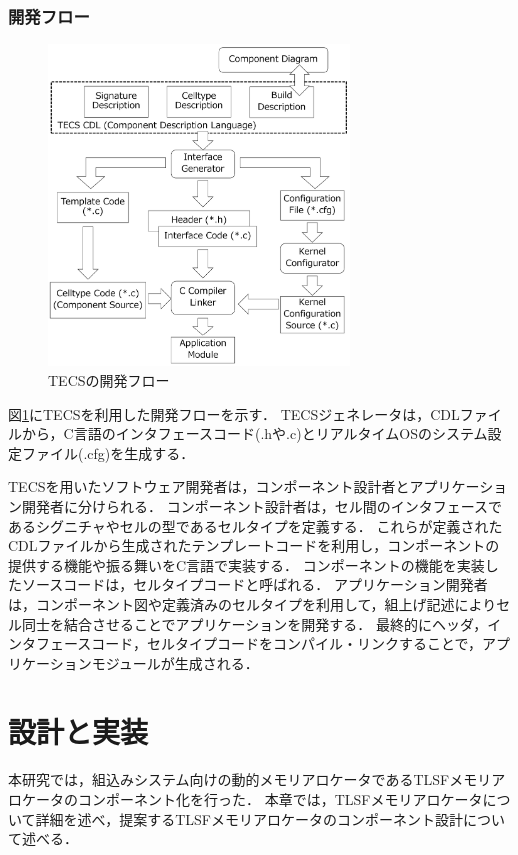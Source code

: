 \documentclass[submit,techrep]{ipsj_v2/UTF8/ipsj}
\begin{document}
\vspace{3mm}
\subsubsection{開発フロー}

\begin{figure}[t]
    \centering
    \includegraphics[width=8cm,clip]{figure/TECSFlow.pdf}
    \caption{TECSの開発フロー}
    \label{fig:TECSFlow}
\end{figure}

図\ref{fig:TECSFlow}にTECSを利用した開発フローを示す．
TECSジェネレータは，CDLファイルから，C言語のインタフェースコード(.hや.c)とリアルタイムOSのシステム設定ファイル(.cfg)を生成する．

TECSを用いたソフトウェア開発者は，コンポーネント設計者とアプリケーション開発者に分けられる．
コンポーネント設計者は，セル間のインタフェースであるシグニチャやセルの型であるセルタイプを定義する．
これらが定義されたCDLファイルから生成されたテンプレートコードを利用し，コンポーネントの提供する機能や振る舞いをC言語で実装する．
コンポーネントの機能を実装したソースコードは，セルタイプコードと呼ばれる．
アプリケーション開発者は，コンポーネント図や定義済みのセルタイプを利用して，組上げ記述によりセル同士を結合させることでアプリケーションを開発する．
最終的にヘッダ，インタフェースコード，セルタイプコードをコンパイル・リンクすることで，アプリケーションモジュールが生成される．

\section{設計と実装}
\label{sec:DesignImplementation}

本研究では，組込みシステム向けの動的メモリアロケータであるTLSFメモリアロケータのコンポーネント化を行った．
本章では，TLSFメモリアロケータについて詳細を述べ，提案するTLSFメモリアロケータのコンポーネント設計について述べる．
\end{document}
